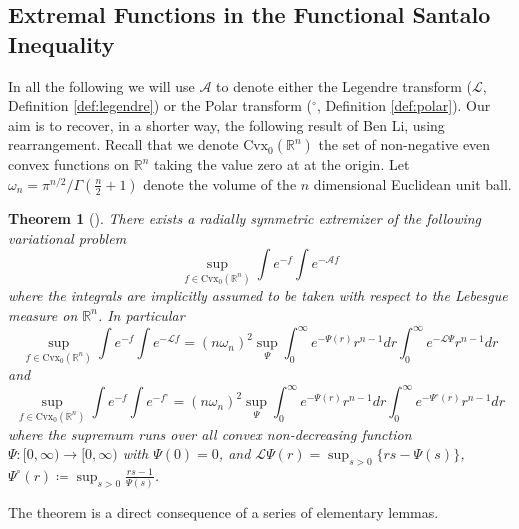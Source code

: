 \documentclass[11pt]{article}
\newtheorem{theorem}[conjecture]{Theorem}
\newcommand{\1}{[1]}
\begin{document}
\subsection{Extremal Functions in the Functional Santalo Inequality}

In all the following we will use $\mathcal{A}$ to denote either the Legendre transform ($\mathcal{L}$, Definition \ref{def:legendre}) or the Polar transform ($^\circ$, Definition \ref{def:polar}). Our aim is to recover, in a shorter way, the following result of Ben Li, using rearrangement. Recall that we denote $\mathrm{Cvx}_0(\mathbb{R}^{n})$ the set of non-negative even convex functions on $\mathbb{R}^{n}$ taking the value zero at at the origin. 
Let $\omega_{n}=\pi^{n/2}/\Gamma(\frac{n}{2}+1)$ denote the volume of the $n$ dimensional Euclidean unit ball.

\begin{theorem}[\cite{li}] \label{thm: existence of extremizer}
    There exists a radially symmetric extremizer of the following variational problem 
    $$
    \sup_{f\in\mathrm{Cvx}_0(\mathbb{R}^{n})}\int e^{-f}\int e^{-\mathcal{A}f}
    $$ 
    where the integrals are implicitly assumed to be taken with respect to the Lebesgue measure on $\mathbb{R}^{n}$. 
In particular
$$
    \sup_{f\in \mathrm{Cvx}_0(\mathbb{R}^{n})} 
    \int e^{-f}\int e^{-\mathcal{L}f}
    =
    (n\omega_{n})^2 
    \sup_{\Psi} 
    \int_0^\infty e^{-\Psi(r)}r^{n-1}dr 
    \int_0^\infty e^{-\mathcal{L}\Psi}r^{n-1}dr 
$$
and
$$
    \sup_{f\in \mathrm{Cvx}_0(\mathbb{R}^{n})} 
    \int e^{-f}\int e^{-f^\circ}
    =
    (n\omega_{n})^2 
    \sup_{\Psi} 
    \int_0^\infty e^{-\Psi(r)}r^{n-1}dr 
    \int_0^\infty e^{-\Psi^\circ(r)}r^{n-1}dr
$$
where the supremum runs over all convex non-decreasing function $\Psi \colon [0,\infty) \to [0,\infty)$ with $\Psi(0)=0$, and 
$\mathcal{L}\Psi(r)=\sup_{s>0}\{rs-\Psi(s)\}$, 
$\Psi^\circ(r) \coloneqq \sup_{s>0} \frac{rs-1}{\Psi(s)}$. 
\end{theorem} 

The theorem is a direct consequence of a series of elementary lemmas.
\end{document}
